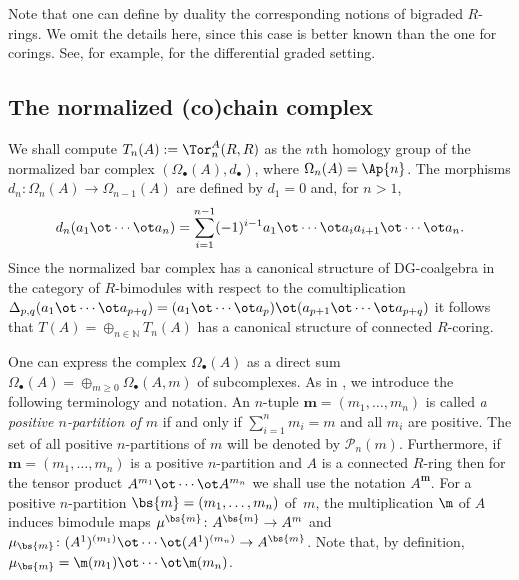 Note that one can def\/ine by duality the corresponding notions of bigraded $R$-rings. We omit the details here, since this case is better known than the one for corings. See, for example, \cite{pi} for the dif\/ferential graded setting.

\subsection{The normalized (co)chain complex} \label{sec-t(a)}
We shall compute $T_n(A):=\Tor_n^A(R,R)$ as the $n$th homology group of the normalized bar complex $(\Omega_\bullet(A), d_\bullet)$, where $\Omega_n(A)=\Ap{n}$. The morphisms $d_n\colon \Omega_n(A)\to\Omega_{n-1}(A)$ are def\/ined by $d_1=0$ and, for $n>1$,
\begin{gather*}
d_n(a_1\ot\cdots \ot a_n)=\sum_{i=1}^{n-1}(-1)^{i-1}a_1\ot\cdots \ot a_ia_{i+1}\ot\cdots\ot a_n.
\end{gather*}
Since the normalized bar complex has a canonical structure of DG-coalgebra in the category of $R$-bimodules with respect to the comultiplication $\Delta_{p,q}(a_1\ot\cdots \ot a_{p+q})=(a_1\ot\cdots \ot a_{p})\ot(a_{p+1}\ot\cdots \ot a_{p+q})$ it follows that $T(A)=\oplus_{n \in \mathbb{N}} T_n(A)$ has a canonical structure of connected $R$-coring.
	
One can express the complex $\Omega_\bullet(A)$ as a direct sum $\Omega_\bullet(A)=\oplus_{m \geq 0} \Omega_\bullet(A,m)$ of subcomplexes. As in \cite[Section~1.6]{mst}, we introduce the following terminology and notation. An $n$-tuple $\boldsymbol{m}=(m_1,\dots,m_n)$ is called \textit{a positive $n$-partition of $m$} if and only if $\sum\limits_{i=1}^n m_i=m$ and all $m_i$ are positive. The set of all positive $n$-partitions of $m$ will be denoted by $\mathscr{P}_n(m)$. Furthermore, if $\boldsymbol{m}=(m_1,\dots,m_n)$ is a positive $n$-partition and $A$ is a connected $R$-ring then for the tensor product $A^{m_1}\ot\cdots\ot A^{m_n}$ we shall use the notation $A^{\boldsymbol{m}}$. For a positive $n$-partition $\bs{m}=(m_1,\dots,m_n)$ of~$m$, the multiplication $\m$ of $A$ induces bimodule maps $\mu^{\bs{m}}\colon A^{\bs{m}}\to A^m$ and $\mu_{\bs{m}}\colon (A^1)^{(m_1)}\ot\cdots \ot(A^1)^{(m_n)}\to A^{\bs{m}}$. Note that, by def\/inition, $\mu_{\bs{m}}=\m(m_1)\ot\cdots\ot\m(m_n)$.

